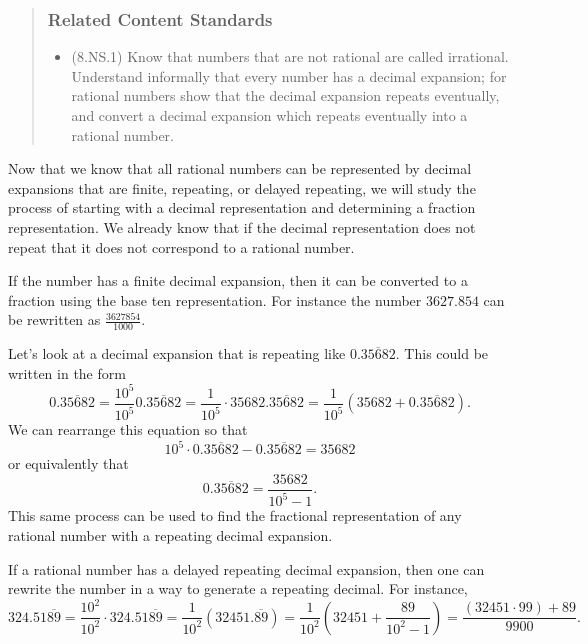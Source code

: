 \documentclass[
]{book}
\providecommand{\tightlist}{%
  \setlength{\itemsep}{0pt}\setlength{\parskip}{0pt}}
\theoremstyle{definition}
\theoremstyle{definition}
\theoremstyle{definition}
\theoremstyle{remark}
\begin{document}
\begin{quote}
\hypertarget{related-content-standards-12}{%
\subsubsection*{Related Content Standards}\label{related-content-standards-12}}

\begin{itemize}
\tightlist
\item
  (8.NS.1) Know that numbers that are not rational are called irrational. Understand informally that every number has a decimal expansion; for rational numbers show that the decimal expansion repeats eventually, and convert a decimal expansion which repeats eventually into a rational number.
\end{itemize}
\end{quote}

Now that we know that all rational numbers can be represented by decimal expansions that are finite, repeating, or delayed repeating, we will study the process of starting with a decimal representation and determining a fraction representation. We already know that if the decimal representation does not repeat that it does not correspond to a rational number.

If the number has a finite decimal expansion, then it can be converted to a fraction using the base ten representation. For instance the number \(3627.854\) can be rewritten as \(\frac{3627854}{1000}\).

Let's look at a decimal expansion that is repeating like \(0.\overline{35682}\). This could be written in the form \[0.\overline{35682}= \frac{10^5}{10^5} 0.\overline{35682} = \frac{1}{10^5} \cdot 35682.\overline{35682} = \frac{1}{10^5} \left( 35682 + 0.\overline{35682}\right).\] We can rearrange this equation so that
\[10^5 \cdot 0.\overline{35682} - 0.\overline{35682} = 35682\] or equivalently that
\[0.\overline{35682} = \frac{35682}{10^5-1}.\] This same process can be used to find the fractional representation of any rational number with a repeating decimal expansion.

If a rational number has a delayed repeating decimal expansion, then one can rewrite the number in a way to generate a repeating decimal. For instance,
\[324.51\overline{89} = \frac{10^2}{10^2} \cdot 324.51\overline{89} = \frac{1}{10^2} \left( 32451.\overline{89}\right) = \frac{1}{10^2} \left( 32451+\frac{89}{10^2-1} \right) = \frac{(32451\cdot 99)+89}{9900}.\]
\end{document}
